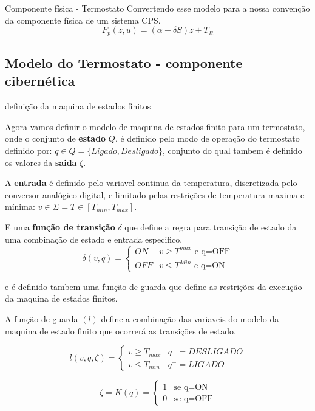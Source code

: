 \documentclass{beamer}
\begin{document}
\begin{frame}{Componente física - Termostato}
	Convertendo esse modelo para a nossa convenção da componente física de um sistema CPS.
	\begin{equation}
		F_p(z,u) = (\alpha - \delta S)z + T_R
	\end{equation}
\end{frame}

\subsection{Modelo do Termostato - componente cibernética}

\begin{frame}{definição da maquina de estados finitos}
	\par Agora vamos definir o modelo de maquina de estados finito para um termostato, onde o conjunto de \textbf{estado} $Q$, é definido pelo modo de operação do termostato definido por: $q \in Q = \{ Ligado, Desligado\}$, conjunto do qual tambem é definido os valores da \textbf{saida} $\zeta$.
	\par A \textbf{entrada} é definido pelo variavel continua da temperatura, discretizada pelo conversor analógico digital, e limitado pelas restrições de temperatura maxima e mínima: $v \in \Sigma = T \in [ T_{min},T_{max}]$.
	\par E uma \textbf{função de transição} $\delta$ que define a regra para transição de estado da uma combinação de estado e entrada especifico.
	\begin{equation}
		\delta(v,q) =
		\begin{cases}
			ON & \text{$v \ge T^{max}$ e q=OFF}\\
			OFF & \text{$v \le T^{Min}$ e q=ON}
		\end{cases}
	\end{equation}
\end{frame}

\begin{frame}
e é definido tambem uma função de guarda que define as restrições da execução da maquina de estados finitos.
\begin{definition}
	A função de guarda $(l)$ define a combinação das variaveis do modelo da maquina de estado finito que ocorrerá as transições de estado.
\end{definition}

\begin{equation}
	l(v,q,\zeta) =
	\begin{cases}
		v \ge T_{max} & q^{+}=DESLIGADO\\
		v \le T_{min} & q^{+}=LIGADO
	\end{cases}       
\end{equation}

\begin{equation}
	\zeta = K(q) =
	\begin{cases}
		1 & \text{se q=ON}\\
		0 & \text{se q=OFF}
	\end{cases}
\end{equation}

\end{frame}
\end{document}
